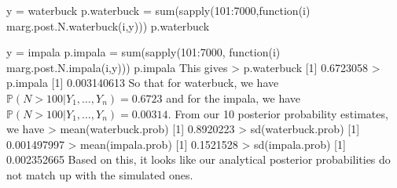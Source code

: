 \documentclass[letterpaper,10pt]{amsart}
\newcommand{\p}[1]{\mathbb{P}\!\left(#1\right)}
\newenvironment{verbatimcode}{\bigskip \scriptsize \verbatim}{\endverbatim \normalsize \bigskip}
\begin{document}
\begin{enumerate}[{1}.1]
\begin{verbatimcode}
y = waterbuck
p.waterbuck = sum(sapply(101:7000,function(i) marg.post.N.waterbuck(i,y)))
p.waterbuck

y = impala
p.impala = sum(sapply(101:7000, function(i) marg.post.N.impala(i,y)))
p.impala
\end{verbatimcode}
This gives
\begin{verbatimcode}
> p.waterbuck
[1] 0.6723058
> p.impala
[1] 0.003140613
\end{verbatimcode}
So that for waterbuck, we have $\p{N >100 | Y_1, \ldots, Y_n} = 0.6723$ and for the impala, we have $\p{N > 100 | Y_1, \ldots, Y_n} = 0.00314$. From our 10 posterior probability estimates, we have
\begin{verbatimcode}
> mean(waterbuck.prob)
[1] 0.8920223
> sd(waterbuck.prob)
[1] 0.001497997
> mean(impala.prob)
[1] 0.1521528
> sd(impala.prob)
[1] 0.002352665
\end{verbatimcode}
Based on this, it looks like our analytical posterior probabilities do not match up with the simulated ones. 


\end{enumerate}
\end{document}
